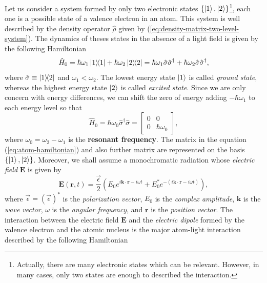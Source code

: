 Let us consider a system formed by only two electronic states $ \{\ket{1}, \ket{2}\} $\footnote{Actually, there are many electronic states which can be relevant. However, in many cases, only two states are enough to described the interaction.}, each one is a possible state of a valence electron in an atom. This system is well described by the density operator $ \hat{\rho} $ given by (\ref{eq:density-matrix-two-level-system}). The dynamics of theses states in the absence of a light field is given by the following Hamiltonian
\begin{equation}
	 \hat{H}_0 = \hbar \omega_1 \ketbra{1}{1} + \hbar \omega_2 \ketbra{2}{2} = \hbar \omega_1 \hat{\sigma} \hat{\sigma}^{\dagger} + \hbar \omega_2 \hat{\sigma} \hat{\sigma}^{\dagger},
\end{equation}
where $ \hat{\sigma} \equiv \ketbra{1}{2} $ and $ \omega_1 < \omega_2 $. The lowest energy state $ \ket{1} $ is called \textit{ground state}, whereas the highest energy state $ \ket{2} $ is called \textit{excited state}. Since we are only concern with energy differences, we can shift the zero of energy adding $ - \hbar \omega_1 $ to each energy level so that 
\begin{equation}
	\hat{H}_0 = \hbar \omega_0 \hat{\sigma}^{\dagger} \hat{\sigma} = \left[ \begin{matrix} 0 & 0 \\ 0 & \hbar \omega_0 \end{matrix} \right],
	\label{eq:atom-hamiltonian}
\end{equation}
where $ \omega_0 = \omega_2 - \omega_1 $ is the \textbf{resonant frequency}. The matrix in the equation (\ref{eq:atom-hamiltonian}) and also further matrix are represented on the basis $ \{\ket{1}, \ket{2}\} $. Moreover, we shall assume a monochromatic radiation whose \textit{electric field} $ \mathbf{E} $ is given by
\begin{equation}
	\mathbf{E}(\mathbf{r}, t) = \frac{\vec{\epsilon}}{2}(E_0 e^{i \mathbf{k} \cdot \mathbf{r} - i \omega t} + E_0^* e^{-(i \mathbf{k} \cdot \mathbf{r} - i \omega t)}),
	\label{eq:monochromatic-radiation}
\end{equation}
where $ \vec{\epsilon} = (\vec{\epsilon})^* $ is the \textit{polarization vector}, $ E_0 $ is the \textit{complex amplitude}, $ \mathbf{k} $ is the \textit{wave vector}, $ \omega $ is the \textit{angular frequency}, and $ \mathbf{r} $ is the \textit{position vector}. The interaction between the electric field $ \mathbf{E} $ and the \textit{electric dipole} formed by the valence electron and the atomic nucleus is the major atom-light interaction described by the following Hamiltonian

